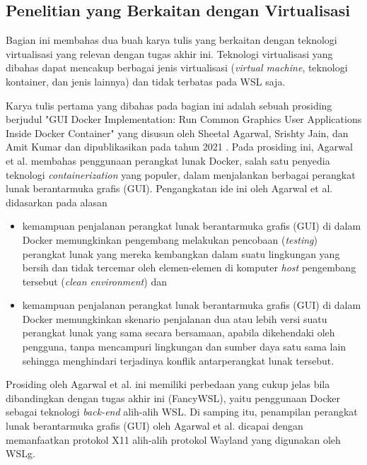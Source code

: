 \subsection{Penelitian yang Berkaitan dengan Virtualisasi}

Bagian ini membahas dua buah karya tulis yang berkaitan dengan teknologi virtualisasi yang relevan dengan tugas akhir ini. Teknologi virtualisasi yang dibahas dapat mencakup berbagai jenis virtualisasi (\textit{virtual machine}, teknologi kontainer, dan jenis lainnya) dan tidak terbatas pada WSL saja.

Karya tulis pertama yang dibahas pada bagian ini adalah sebuah prosiding berjudul "GUI Docker Implementation: Run Common Graphics User Applications Inside Docker Container" yang disusun oleh Sheetal Agarwal, Srishty Jain, dan Amit Kumar dan dipublikasikan pada tahun 2021 \cite{agarwal2021gui}. Pada prosiding ini, Agarwal et al. membahas penggunaan perangkat lunak Docker, salah satu penyedia teknologi \textit{containerization} yang populer, dalam menjalankan berbagai perangkat lunak berantarmuka grafis (GUI). Pengangkatan ide ini oleh Agarwal et al. didasarkan pada alasan
\begin{itemize}
    \item kemampuan penjalanan perangkat lunak berantarmuka grafis (GUI) di dalam Docker memungkinkan pengembang melakukan pencobaan (\textit{testing}) perangkat lunak yang mereka kembangkan dalam suatu lingkungan yang bersih dan tidak tercemar oleh elemen-elemen di komputer \textit{host} pengembang tersebut (\textit{clean environment}) dan
    \item kemampuan penjalanan perangkat lunak berantarmuka grafis (GUI) di dalam Docker memungkinkan skenario penjalanan dua atau lebih versi suatu perangkat lunak yang sama secara bersamaan, apabila dikehendaki oleh pengguna, tanpa mencampuri lingkungan dan sumber daya satu sama lain sehingga menghindari terjadinya konflik antarperangkat lunak tersebut.
\end{itemize}
Prosiding oleh Agarwal et al. ini memiliki perbedaan yang cukup jelas bila dibandingkan dengan tugas akhir ini (FancyWSL), yaitu penggunaan Docker sebagai teknologi \textit{back-end} alih-alih WSL. Di samping itu, penampilan perangkat lunak berantarmuka grafis (GUI) oleh Agarwal et al. dicapai dengan memanfaatkan protokol X11 alih-alih protokol Wayland yang digunakan oleh WSLg.

